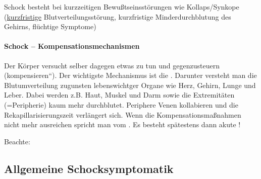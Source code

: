  Schock besteht bei kurzzeitigen 
Bewußtseinsstörungen wie Kollaps/Synkope
(\underline{kurzfristige} Blutverteilungsstörung,
kurzfristige Minderdurchblutung des Gehirns,  flüchtige Symptome)


\paragraph{Schock --  Kompensationsmechanismen}

Der Körper versucht selber dagegen etwas zu tun und gegenzusteuern
({\quotedblbase}kompensieren{\textquotedblleft}). Der
wichtigste Mechanismus ist die
. Darunter versteht
man die Blutumverteilung zugunsten lebenswichtger Organe wie
Herz, Gehirn, Lunge und Leber. Dabei werden z.B. Haut, Muskel
und Darm
sowie die Extremitäten (=Peripherie) kaum mehr  durchblutet.
Periphere Venen kollabieren und die Rekapillarisierungszeit
verlängert sich. Wenn die Kompensationsmaßnahmen 
nicht mehr ausreichen spricht man vom . Es besteht
spätestens dann akute !

Beachte: 



\subsection{Allgemeine Schocksymptomatik}

